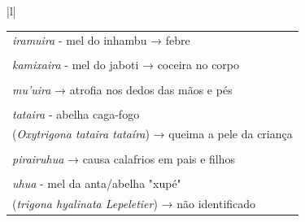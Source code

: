 






\begin{table}[H]
\centering
\label{my-label}
\begin{tabular}{|l|}
\hline
{}                                                                                                                                                                                                                                                                                        \\ \hline
\begin{tabular}[c]{@{}l@{}}\emph{iramuira} - mel do inhambu → febre\\ \\ \emph{kamixaira} - mel do jaboti → coceira no corpo\\ \\ \emph{mu'uira} → atrofia nos dedos das mãos e pés\\ \\ \emph{tataira} - abelha caga-fogo\\ (\emph{Oxytrigona tataira tataíra}) → queima a pele da criança\\ \\ \emph{pirairuhua} → causa calafrios em pais e filhos\\ \\ \emph{uhua} - mel da anta/abelha "xupé" \\ (\emph{trigona hyalinata Lepeletier}) → não identificado\end{tabular} \\ \hline
\end{tabular}
\end{table}

